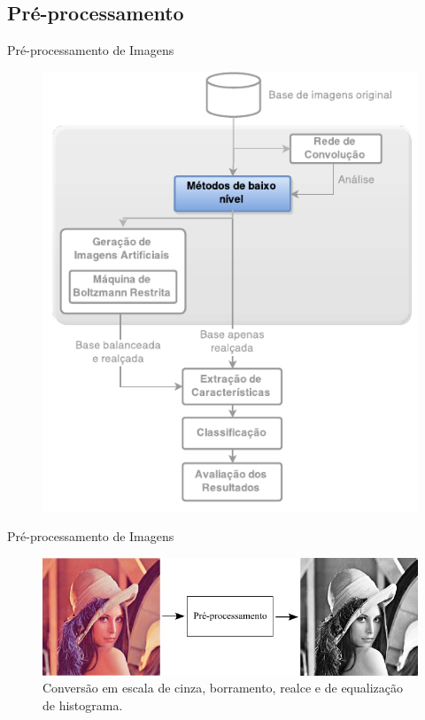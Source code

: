 \documentclass{beamer}
\begin{document}
\subsection{Pré-processamento}
\begin{frame}{Pré-processamento de Imagens}
\begin{figure}
    \includegraphics[height=0.75\textheight]{figuras/geral_metodos.pdf}
\end{figure}
\end{frame}
\begin{frame}{Pré-processamento de Imagens}
\begin{figure}[htbp]
 \begin{center}
   \includegraphics[width=1\linewidth]{figuras/preprocessamento.png}
 \caption{Conversão em escala de cinza, borramento, realce e de equalização de histograma.}
 \end{center}
\end{figure}
\end{frame}
\end{document}
